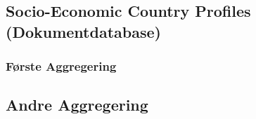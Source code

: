 \subsection{Socio-Economic Country Profiles (Dokumentdatabase)}
\subsubsection{Første Aggregering}

\subsection{Andre Aggregering}
